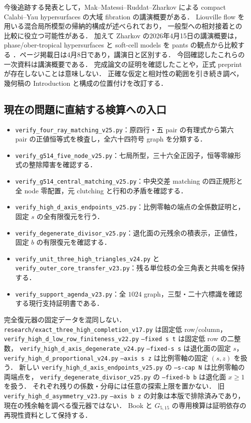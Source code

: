 \documentclass[11pt,a4paper]{article}
\begin{document}
今後追跡する発表として，Mak--Matessi--Ruddat--Zharkov による compact Calabi--Yau
hypersurfaces の大域 fibration の講演概要がある\cite{RuddatAnnouncement2026}．
Liouville flow を用いる混合局所模型の帰納的構成が述べられており，
一般型への相対接着との比較に役立つ可能性がある．
加えて Zharkov の2026年4月15日の講演概要は，
phase/ober-tropical hypersurfaces と soft-cell models を pants の観点から比較する
\cite{ZharkovSoftCells2026}．ページ掲載日は4月8日であり，講演日と区別する．
今回確認したこれらの一次資料は講演概要である．
完成論文の証明を確認したことや，正式 preprint が存在しないことは意味しない．
正確な仮定と相対性の範囲を引き続き調べ，幾何稿の Introduction と構成の位置付けを改訂する．



\subsection{現在の問題に直結する検算への入口}

\begin{itemize}
\item \nolinkurl{verify_four_ray_matching_v25.py}：原四行・五 pair の有理式から第六 pair の正値恒等式を検査し，全六十四符号 graph を分類する．
\item \nolinkurl{verify_g514_five_node_v25.py}：七局所型，三十六全正因子，恒等零線形式の整除障害を確認する．
\item \nolinkurl{verify_g514_central_matching_v25.py}：中央交差 matching の四正規形と全 node 零配置，元 clutching と行和の矛盾を確認する．
\item \nolinkurl{verify_high_d_axis_endpoints_v25.py}：比例零軸の端点の全係数証明と，固定 $s$ の全有限復元を行う．
\item \nolinkurl{verify_degenerate_divisor_v25.py}：退化面の元残余の積表示，正値性，固定 $b$ の有限復元を確認する．
\item \nolinkurl{verify_unit_three_high_triangles_v24.py} と \nolinkurl{verify_outer_core_transfer_v23.py}：残る単位枝の全三角表と共鳴を保持する．
\item \nolinkurl{verify_support_agenda_v23.py}：全 $1024$ graph，三型・二十六標識を確認する現行支持証明書である．
\end{itemize}

完全復元器の固定データを混同しない．
\nolinkurl{research/exact_three_high_completion_v17.py} は固定低 row/column，
\nolinkurl{verify_high_d_low_row_finiteness_v22.py} \texttt{--fixed s t} は固定低 row の二整数，
\nolinkurl{verify_high_d_axis_degenerate_v24.py} \texttt{--fixed-s s} は退化面の固定 $s$，
\nolinkurl{verify_high_d_proportional_v24.py} \texttt{--axis s z} は比例零軸の固定 $(s,z)$ を扱う．
新しい \nolinkurl{verify_high_d_axis_endpoints_v25.py} の \texttt{--s-cap N} は比例零軸の両端点を，
\nolinkurl{verify_degenerate_divisor_v25.py} の \texttt{--fixed-b b} は退化面 $x\ge1$ を扱う．
それぞれ残りの係数・分母には任意の探索上限を置かない．
旧 \nolinkurl{verify_high_d_asymmetry_v23.py} \texttt{--axis b z} の対象は本版で排除済みであり，
現在の残余軸を調べる復元器ではない．
Book と $G_{5,15}$ の専用検算は証明依存の再現性資料として保持する．
\end{document}

